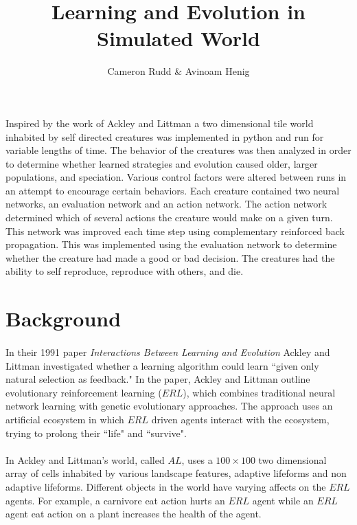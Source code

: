 \documentclass[12pt]{report}
\author{Cameron Rudd \& Avinoam Henig}
\title{Learning and Evolution in Simulated World}
\begin{document}
\maketitle
\abstract 
Inspired by the work of Ackley and Littman  a two dimensional tile world inhabited by self directed creatures was implemented in python and run for variable lengths of time. The behavior of the creatures was then analyzed in order to determine whether learned strategies and evolution caused older, larger populations, and speciation. Various control factors were altered between runs in an attempt to encourage certain behaviors. Each creature contained two neural networks, an evaluation network and an action network. The action network determined which of several actions the creature would make on a given turn. This network was improved each time step using complementary reinforced back propagation. This was implemented using the evaluation network to determine whether the creature had made a good or bad decision. The creatures had the ability to self reproduce, reproduce with others, and die. 

\section*{Background}

\paragraph{} In their 1991 paper \textit{Interactions Between Learning and Evolution}  Ackley and Littman investigated whether a learning algorithm could learn ``given only natural selection as feedback." In the paper, Ackley and Littman outline evolutionary reinforcement learning ($ERL$), which combines traditional neural network learning with genetic evolutionary approaches. The approach uses an artificial ecosystem in which $ERL$ driven agents interact with the ecosystem, trying to prolong their ``life" and ``survive".
\paragraph{} In Ackley and Littman's world, called $AL$, uses a $100\times 100$ two dimensional array of cells inhabited by various landscape features, adaptive lifeforms and non adaptive lifeforms. Different objects in the world have varying affects on the $ERL$ agents. For example, a carnivore eat action hurts an $ERL$ agent while an $ERL$ agent eat action on a plant increases the health of the agent. 
\end{document}
